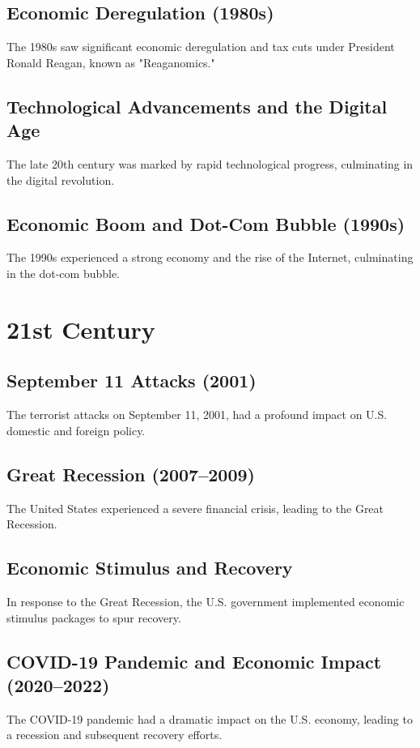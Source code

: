 \documentclass{book}
\begin{document}
\subsection{Economic Deregulation (1980s)}
\label{subsec:economic-deregulation}
The 1980s saw significant economic deregulation and tax cuts under President Ronald Reagan, known as "Reaganomics."

\subsection{Technological Advancements and the Digital Age}
\label{subsec:technological-advancements-digital-age}
The late 20th century was marked by rapid technological progress, culminating in the digital revolution.

\subsection{Economic Boom and Dot-Com Bubble (1990s)}
\label{subsec:economic-boom-dot-com-bubble}
The 1990s experienced a strong economy and the rise of the Internet, culminating in the dot-com bubble.

\section{21st Century}
\label{sec:21st-century}
\subsection{September 11 Attacks (2001)}
\label{subsec:september-11-attacks}
The terrorist attacks on September 11, 2001, had a profound impact on U.S. domestic and foreign policy.

\subsection{Great Recession (2007–2009)}
\label{subsec:great-recession}
The United States experienced a severe financial crisis, leading to the Great Recession.

\subsection{Economic Stimulus and Recovery}
\label{subsec:economic-stimulus-recovery}
In response to the Great Recession, the U.S. government implemented economic stimulus packages to spur recovery.

\subsection{COVID-19 Pandemic and Economic Impact (2020–2022)}
\label{subsec:covid19-pandemic-economic-impact}
The COVID-19 pandemic had a dramatic impact on the U.S. economy, leading to a recession and subsequent recovery efforts.
\end{document}
